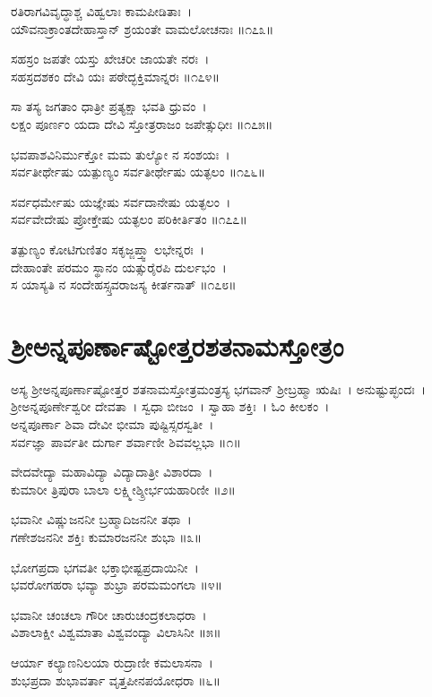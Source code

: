 ರತಿರಾಗವಿವೃದ್ಧಾಶ್ಚ ವಿಹ್ವಲಾಃ ಕಾಮಪೀಡಿತಾಃ~।\\
ಯೌವನಾಕ್ರಾಂತದೇಹಾಸ್ತಾನ್ ಶ್ರಯಂತೇ ವಾಮಲೋಚನಾಃ ॥೧೭೩॥

ಸಹಸ್ರಂ ಜಪತೇ ಯಸ್ತು ಖೇಚರೀ ಜಾಯತೇ ನರಃ~।\\
ಸಹಸ್ರದಶಕಂ ದೇವಿ ಯಃ ಪಠೇದ್ಭಕ್ತಿಮಾನ್ನರಃ ॥೧೭೪॥

ಸಾ ತಸ್ಯ ಜಗತಾಂ ಧಾತ್ರೀ ಪ್ರತ್ಯಕ್ಷಾ ಭವತಿ ಧ್ರುವಂ~।\\
ಲಕ್ಷಂ ಪೂರ್ಣಂ ಯದಾ ದೇವಿ ಸ್ತೋತ್ರರಾಜಂ ಜಪೇತ್ಸುಧೀಃ ॥೧೭೫॥

ಭವಪಾಶವಿನಿರ್ಮುಕ್ತೋ ಮಮ ತುಲ್ಯೋ ನ ಸಂಶಯಃ~।\\
ಸರ್ವತೀರ್ಥೇಷು ಯತ್ಪುಣ್ಯಂ ಸರ್ವತೀರ್ಥೇಷು ಯತ್ಫಲಂ ॥೧೭೬॥

ಸರ್ವಧರ್ಮೇಷು ಯಜ್ಞೇಷು ಸರ್ವದಾನೇಷು ಯತ್ಫಲಂ~।\\
ಸರ್ವವೇದೇಷು ಪ್ರೋಕ್ತೇಷು ಯತ್ಫಲಂ ಪರಿಕೀರ್ತಿತಂ ॥೧೭೭॥

ತತ್ಪುಣ್ಯಂ ಕೋಟಿಗುಣಿತಂ ಸಕೃಜ್ಜಪ್ತ್ವಾ ಲಭೇನ್ನರಃ~।\\
ದೇಹಾಂತೇ ಪರಮಂ ಸ್ಥಾನಂ ಯತ್ಸುರೈರಪಿ ದುರ್ಲಭಂ~।\\
ಸ ಯಾಸ್ಯತಿ ನ ಸಂದೇಹಸ್ಸ್ತವರಾಜಸ್ಯ ಕೀರ್ತನಾತ್ ॥೧೭೮॥
\section{ಶ್ರೀಅನ್ನಪೂರ್ಣಾಷ್ಟೋತ್ತರಶತನಾಮಸ್ತೋತ್ರಂ }
ಅಸ್ಯ ಶ್ರೀಅನ್ನಪೂರ್ಣಾಷ್ಟೋತ್ತರ ಶತನಾಮಸ್ತೋತ್ರಮಂತ್ರಸ್ಯ ಭಗವಾನ್ ಶ್ರೀಬ್ರಹ್ಮಾ ಋಷಿಃ~। ಅನುಷ್ಟುಪ್ಛಂದಃ~। ಶ್ರೀಅನ್ನಪೂರ್ಣೇಶ್ವರೀ ದೇವತಾ~। ಸ್ವಧಾ ಬೀಜಂ~। ಸ್ವಾಹಾ ಶಕ್ತಿಃ~। ಓಂ ಕೀಲಕಂ~।\\

ಅನ್ನಪೂರ್ಣಾ ಶಿವಾ ದೇವೀ ಭೀಮಾ ಪುಷ್ಟಿಸ್ಸರಸ್ವತೀ~।\\
ಸರ್ವಜ್ಞಾ ಪಾರ್ವತೀ ದುರ್ಗಾ ಶರ್ವಾಣೀ ಶಿವವಲ್ಲಭಾ ॥೧॥

ವೇದವೇದ್ಯಾ ಮಹಾವಿದ್ಯಾ ವಿದ್ಯಾದಾತ್ರೀ ವಿಶಾರದಾ~।\\
ಕುಮಾರೀ ತ್ರಿಪುರಾ ಬಾಲಾ ಲಕ್ಷ್ಮೀಶ್ಶ್ರೀರ್ಭಯಹಾರಿಣೀ ॥೨॥

ಭವಾನೀ ವಿಷ್ಣುಜನನೀ ಬ್ರಹ್ಮಾದಿಜನನೀ ತಥಾ~।\\
ಗಣೇಶಜನನೀ ಶಕ್ತಿಃ ಕುಮಾರಜನನೀ ಶುಭಾ ॥೩॥

ಭೋಗಪ್ರದಾ ಭಗವತೀ ಭಕ್ತಾಭೀಷ್ಟಪ್ರದಾಯಿನೀ~।\\
ಭವರೋಗಹರಾ ಭವ್ಯಾ ಶುಭ್ರಾ ಪರಮಮಂಗಲಾ ॥೪॥

ಭವಾನೀ ಚಂಚಲಾ ಗೌರೀ ಚಾರುಚಂದ್ರಕಲಾಧರಾ~।\\
ವಿಶಾಲಾಕ್ಷೀ ವಿಶ್ವಮಾತಾ ವಿಶ್ವವಂದ್ಯಾ ವಿಲಾಸಿನೀ ॥೫॥

ಆರ್ಯಾ ಕಲ್ಯಾಣನಿಲಯಾ ರುದ್ರಾಣೀ ಕಮಲಾಸನಾ~।\\
ಶುಭಪ್ರದಾ ಶುಭಾವರ್ತಾ ವೃತ್ತಪೀನಪಯೋಧರಾ ॥೬॥

